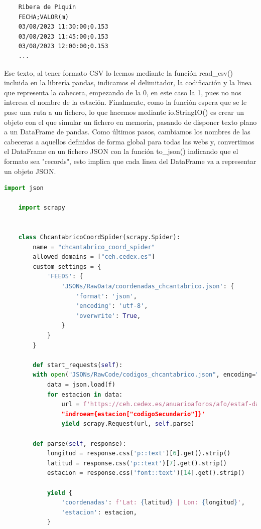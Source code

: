 \begin{verbatim}
	Ribera de Piquín
	FECHA;VALOR(m)
	03/08/2023 11:30:00;0.153
	03/08/2023 11:45:00;0.153
	03/08/2023 12:00:00;0.153
	...
\end{verbatim}

Ese texto, al tener formato CSV lo leemos mediante la función read\_csv() incluida en la librería pandas, indicamos el delimitador, la codificación y la linea que representa la cabecera, empezando de la 0, en este caso la 1, pues no nos interesa el nombre de la estación. Finalmente, como la función espera que se le pase una ruta a un fichero, lo que hacemos mediante io.StringIO() es crear un objeto con el que simular un fichero en memoria, pasando de disponer texto plano a un DataFrame de pandas.\newline
\newline
Como últimos pasos, cambiamos los nombres de las cabeceras a aquellos definidos de forma global para todas las webs y, convertimos el DataFrame en un fichero JSON con la función to\_json() indicando que el formato sea "records", esto implica que cada linea del DataFrame va a representar un objeto JSON.

\begin{lstlisting}[language=Python, caption={Chcantabrico Coordinates Spider}]
	import json
	
	import scrapy
	
	
	class ChcantabricoCoordSpider(scrapy.Spider):
		name = "chcantabrico_coord_spider"
		allowed_domains = ["ceh.cedex.es"]
		custom_settings = {
			'FEEDS': {
				'JSONs/RawData/coordenadas_chcantabrico.json': {
					'format': 'json',
					'encoding': 'utf-8',
					'overwrite': True,
				}
			}
		}
		
		def start_requests(self):
		with open("JSONs/RawCode/codigos_chcantabrico.json", encoding="utf-8") as f:
			data = json.load(f)
			for estacion in data:
				url = f'https://ceh.cedex.es/anuarioaforos/afo/estaf-datos.asp?"
				"indroea={estacion["codigoSecundario"]}'
				yield scrapy.Request(url, self.parse)
		
		def parse(self, response):
			longitud = response.css('p::text')[6].get().strip()
			latitud = response.css('p::text')[7].get().strip()
			estacion = response.css('font::text')[14].get().strip()
			
			yield {
				'coordenadas': f'Lat: {latitud} | Lon: {longitud}',
				'estacion': estacion,
			}
\end{lstlisting}

